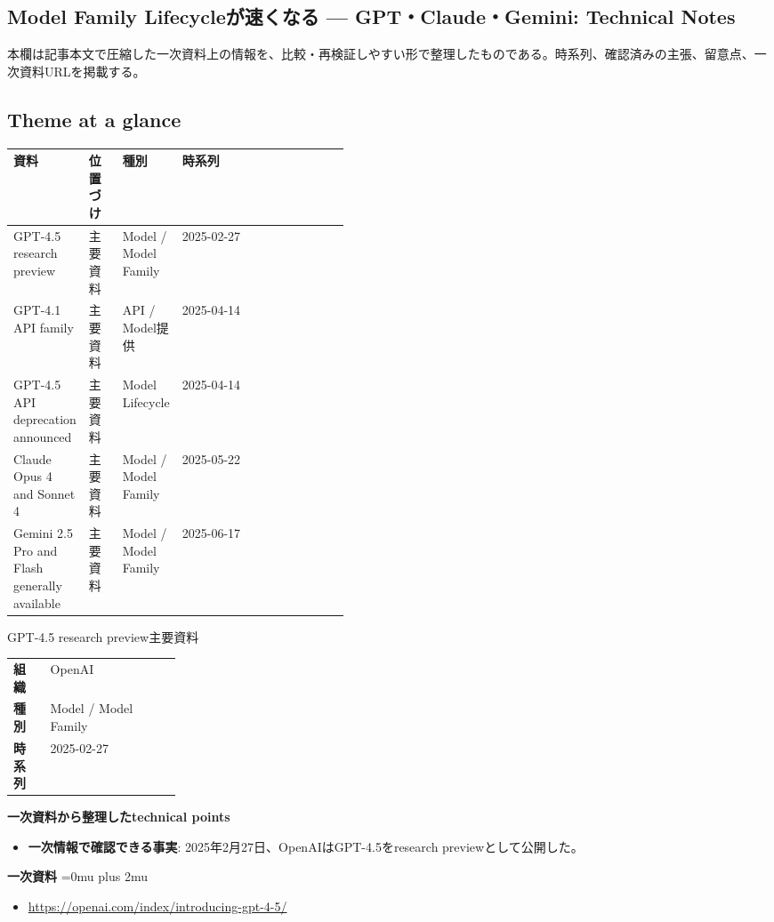 \subsection*{Model Family Lifecycleが速くなる — GPT・Claude・Gemini: Technical Notes}
本欄は記事本文で圧縮した一次資料上の情報を、比較・再検証しやすい形で整理したものである。時系列、確認済みの主張、留意点、一次資料URLを掲載する。
\medskip
\subsection*{Theme at a glance}
\begin{center}
\footnotesize
\begin{tabularx}{\linewidth}{@{}p{0.20\linewidth}p{0.10\linewidth}p{0.14\linewidth}X@{}}
\toprule
資料 & 位置づけ & 種別 & 時系列 \\
\midrule
GPT-4.5 research preview & 主要資料 & Model / Model Family & 2025-02-27   \\
GPT-4.1 API family & 主要資料 & API / Model提供 & 2025-04-14   \\
GPT-4.5 API deprecation announced & 主要資料 & Model Lifecycle & 2025-04-14   \\
Claude Opus 4 and Sonnet 4 & 主要資料 & Model / Model Family & 2025-05-22   \\
Gemini 2.5 Pro and Flash generally available & 主要資料 & Model / Model Family & 2025-06-17   \\
\bottomrule
\end{tabularx}
\end{center}
\normalsize

\begin{technicalnote}{GPT-4.5 research preview}{主要資料}
\begingroup
\begin{tabularx}{\linewidth}{@{}>{\bfseries}p{0.22\linewidth}X@{}}
組織 & OpenAI \\
種別 & Model / Model Family \\
時系列 & 2025-02-27 \\
\end{tabularx}
\smallskip
\begin{minipage}{\linewidth}
{\bfseries 一次資料から整理したtechnical points}
\begin{itemize}[leftmargin=1.5em,itemsep=0.35em]
\item \textbf{一次情報で確認できる事実}: 2025年2月27日、OpenAIはGPT-4.5をresearch previewとして公開した。
\end{itemize}
\begin{samepage}
{\bfseries 一次資料}
\begingroup\sloppy
\Urlmuskip=0mu plus 2mu\relax
\begin{itemize}[leftmargin=1.5em,itemsep=0.25em]
\item {\scriptsize\url{https://openai.com/index/introducing-gpt-4-5/}}
\end{itemize}
\endgroup
\end{samepage}
\end{minipage}
\endgroup
\end{technicalnote}
\medskip

